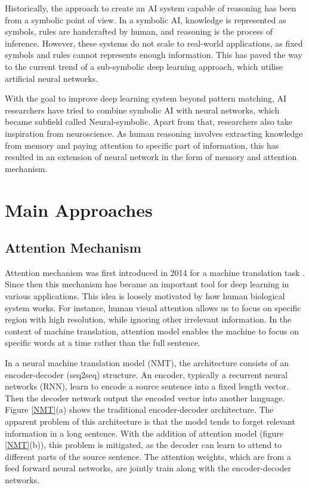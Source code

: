 \documentclass[journal]{IEEEtran}
\begin{document}
Historically, the approach to create an AI system capable of reasoning has been from a symbolic point of view.
In a symbolic AI, knowledge is represented as symbols, rules are handcrafted by human, and reasoning is the process of inference.
However, these systems do not scale to real-world applications, as fixed symbols and rules cannot represents enough information. 
This has paved the way to the current trend of a sub-symbolic deep learning approach, which utilise artificial neural networks. 

With the goal to improve deep learning system beyond pattern matching, AI researchers have tried to combine symbolic AI with neural networks,
which became subfield called Neural-symbolic. Apart from that, researchers also take inspiration from neuroscience. 
As human reasoning involves extracting knowledge from memory and paying attention to specific part of information, 
this has resulted in an extension of neural network in the form of memory and attention mechanism. 

\section{Main Approaches}
\subsection{Attention Mechanism}
Attention mechanism was first introduced in 2014 for a machine translation task \cite{bahdanau2014neural}.
Since then this mechanism has became an important tool for deep learning in various applications. 
This idea is loosely motivated by how human biological system works. For instance, human visual attention allows us to 
focus on specific region with high resolution, while ignoring other irrelevant information. 
In the context of machine translation, attention model enables the machine to focus on specific words at a time 
rather than the full sentence.

In a neural machine translation model (NMT), the architecture consists of an encoder-decoder (seq2seq) structure.
An encoder, typically a recurrent neural networks (RNN), learn to encode a source sentence into a fixed length vector.
Then the decoder network output the encoded vector into another language. Figure \ref{NMT}(a) shows the traditional encoder-decoder architecture.
The apparent problem of this architecture is that the model tends to forget relevant information in a long sentence.
With the addition of attention model (figure \ref{NMT}(b)), this problem is mitigated, 
as the decoder can learn to attend to different parts of the source sentence. 
The attention weights, which are from a feed forward neural networks, are jointly train along with the encoder-decoder networks.
\end{document}

